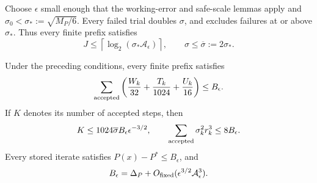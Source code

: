 \documentclass{article}
\begin{document}
Choose $\epsilon$ small enough that the working-error and safe-scale
lemmas apply and $\sigma_0<\sigma_*:=\sqrt{M_P/6}$.
Every failed trial doubles $\sigma$, and
 excludes failures at or above $\sigma_*$.
Thus every finite prefix satisfies
\begin{equation}\label{eq:gs-scale-bound}
 J\le\left\lceil\log_2(\sigma_*\mathcal A_\epsilon)\right\rceil,
 \qquad
 \sigma\le\overline\sigma:=2\sigma_*.
\end{equation}

\begin{lemma}
\label{lem:gs-budget}
Under the preceding conditions, every finite prefix satisfies
\begin{equation}\label{eq:gs-cumulative-budget}
 \sum_{\rm accepted}
 \left(\frac{W_k}{32}+\frac{T_k}{1024}+\frac{U_k}{16}\right)
 \le B_\epsilon.
\end{equation}
If $K$ denotes its number of accepted steps, then
\begin{equation}\label{eq:gs-path-budget}
 K\le1024\overline\sigma B_\epsilon\epsilon^{-3/2},
 \qquad
 \sum_{\rm accepted}\sigma_k^2r_k^3\le8B_\epsilon.
\end{equation}
Every stored iterate satisfies $P(x)-P^*\le B_\epsilon$, and
\begin{equation}\label{eq:gs-budget-asymptotic}
 B_\epsilon
 =\Delta_P+O_{\rm fixed}
       (\epsilon^{3/2}\mathcal A_\epsilon^3).
\end{equation}
\end{lemma}
\end{document}

